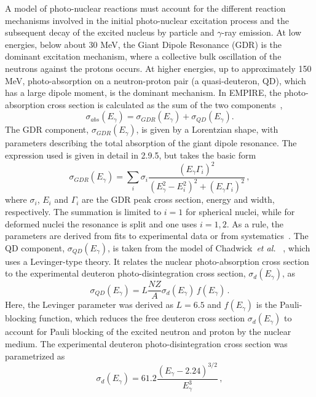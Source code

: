 A model of photo-nuclear reactions must account for the different reaction
mechanisms involved in the initial photo-nuclear excitation process and the
subsequent decay of the excited nucleus by particle and $\gamma$-ray
emission. At low energies, below about 30 MeV, the Giant Dipole Resonance
(GDR) is the dominant excitation mechanism, where a collective bulk
oscillation of the neutrons against the protons occurs. At higher energies,
up to approximately 150 MeV, photo-absorption on a neutron-proton pair (a
quasi-deuteron, QD), which has a large dipole moment, is the dominant
mechanism. In EMPIRE, the photo-absorption cross section is calculated as the
sum of the two components~\cite{PHNuc},
\begin{equation}
\sigma_{abs}(E_{\gamma})=\sigma_{GDR}(E_{\gamma})+\sigma_{QD}(E_{\gamma}).
\end{equation}
The GDR component, $\sigma_{GDR}(E_{\gamma})$, is given by a Lorentzian
shape, with parameters describing the total absorption of the giant dipole
resonance. The expression used is given in detail in 2.9.5, but takes the
basic form
\begin{equation}
\sigma_{GDR}(E_{\gamma})=\sum_{i}\sigma_{i}%
\frac{(E_{\gamma}\Gamma_{i})^{2}}{(E_{\gamma}^{2}-E_{i}^{2})^{2}+(E_{\gamma}%
\Gamma_{i})^{2}}\,,
\end{equation}
\noindent where $\sigma_{i}$, $E_{i}$ and $\Gamma_{i}$ are the GDR peak
cross section, energy and width, respectively. The summation is limited to $%
i=1$ for spherical nuclei, while for deformed nuclei the resonance is split
and one uses $i=1,2$. As a rule, the parameters are derived from fits to
experimental data or from systematics~\cite{RIPL2}. The QD component, $%
\sigma_{QD}(E_{\gamma})$, is taken from the model of Chadwick~\emph{et al.}~%
\cite{chadQD}, which uses a Levinger-type theory. It relates the nuclear
photo-absorption cross section to the experimental deuteron
photo-disintegration cross section, $\sigma_{d}(E_{\gamma})$, as
\begin{equation}
\sigma_{QD}(E_{\gamma})=L\frac{NZ}{A}\sigma_{d}(E_{\gamma})\,
f(E_{\gamma})\,.
\end{equation}
Here, the Levinger parameter was derived as $L=6.5$ and $f(E_{\gamma})$ is
the Pauli-blocking function, which reduces the free deuteron cross section $%
\sigma_{d}(E_{\gamma})$ to account for Pauli blocking of the excited neutron
and proton by the nuclear medium. The experimental deuteron
photo-disintegration cross section was parametrized as
\begin{equation}
\sigma_{d}(E_{\gamma})=61.2\frac{(E_{\gamma}-2.24)^{3/2}}{E_{\gamma}^{3}}\,,
\end{equation}
